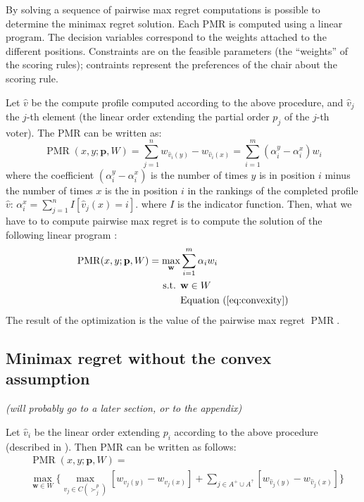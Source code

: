 \documentclass[12pt]{article}
\newcommand{\pprofile}{\textbf{p}}%
\newcommand{\w}{\textbf{w}}%
\DeclareMathOperator{\PMR}{PMR}
\begin{document}
By solving a sequence of pairwise max regret computations is possible to determine the minimax regret solution.
Each PMR is computed using a linear program.
The decision variables correspond to the weights attached to the different positions.
Constraints are on the feasible parameters (the ``weights'' of the scoring rules); contraints represent the preferences of the chair about the scoring rule.

Let $\hat{v}$ be the compute profile computed according to the above procedure, and  $\hat{v}_j$ the $j$-th element (the linear order extending the partial order $p_j$ of the $j$-th voter).
The PMR can be written as:
\[ \PMR(x,y; \pprofile, W) = \sum_{j=1}^n w_{\hat{v}_i(y)} - w_{\hat{v}_i(x)} 
= \sum_{i=1}^m (\alpha_{i}^{y} - \alpha_{i}^{x}) w_i \]
where the coefficient $ (\alpha_{i}^{y} - \alpha_{i}^{x})$ is the number of times $y$ is in position $i$ minus the number of times $x$ is the in position $i$ in the rankings of the completed profile $\hat{v}$:
$\alpha_{i}^{x} = \sum_{j=1}^{n}  I[\hat{v}_{j}(x)=i]$.
where $I$ is the indicator function.
Then, what we have to to compute pairwise max regret is to compute the solution of the following linear program :
\begin{align*}
\PMR(x,y; \pprofile,W) = \max_{\w} & \sum_{i=1}^m \alpha_i w_{i}\\
\text{ s.t. } & \w \in W \\
& \text{Equation } (\ref{eq:convexity})
\end{align*}
The result of the optimization is the value of the pairwise max regret $\PMR$.

\subsection{Minimax regret without the convex assumption}
{\em (will probably go to a later section, or to the appendix) }

\medskip
Let $\hat{v}_i$ be the linear order extending $p_i$ according to the above procedure (described in \cite{Lu2011}).
Then PMR can be written as follows:
\begin{align*}
 &\PMR(x,y; \pprofile, W) =\\ 
 &\max_{\w \in W} \Big \{ \max_{v_j \in C(\succ_j^p)} [w_{v_j(y)} \!-\! w_{v_j(x)}]  \!+\!	 \sum_{j \in A^+ \cup  A^?} [w_{\hat{v}_j(y)} \!-\! w_{\hat{v}_j(x)}] \Big \} 
 \end{align*}
\end{document}

